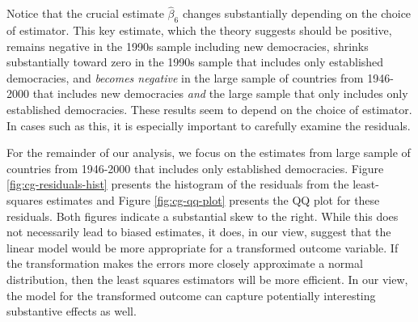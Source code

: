\documentclass[10pt]{article}
\begin{document}
Notice that the crucial estimate $\hat{\beta}_6$ changes substantially depending on the choice of estimator. This key estimate, which the theory suggests should be positive, remains negative in the 1990s sample including new democracies, shrinks substantially toward zero in the 1990s sample that includes only established democracies, and \textit{becomes negative} in the large sample of countries from 1946-2000 that includes new democracies \textit{and} the large sample that only includes only established democracies. These results seem to depend on the choice of estimator. In cases such as this, it is especially important to carefully examine the residuals.

For the remainder of our analysis, we focus on the estimates from large sample of countries from 1946-2000 that includes only established democracies. Figure \ref{fig:cg-residuals-hist} presents the histogram of the residuals from the least-squares estimates and Figure \ref{fig:cg-qq-plot} presents the QQ plot for these residuals. Both figures indicate a substantial skew to the right. While this does not necessarily lead to biased estimates, it does, in our view, suggest that the linear model would be more appropriate for a transformed outcome variable. If the transformation makes the errors more closely approximate a normal distribution, then the least squares estimators will be more efficient. In our view, the model for the transformed outcome can capture potentially interesting substantive effects as well.
\end{document}
